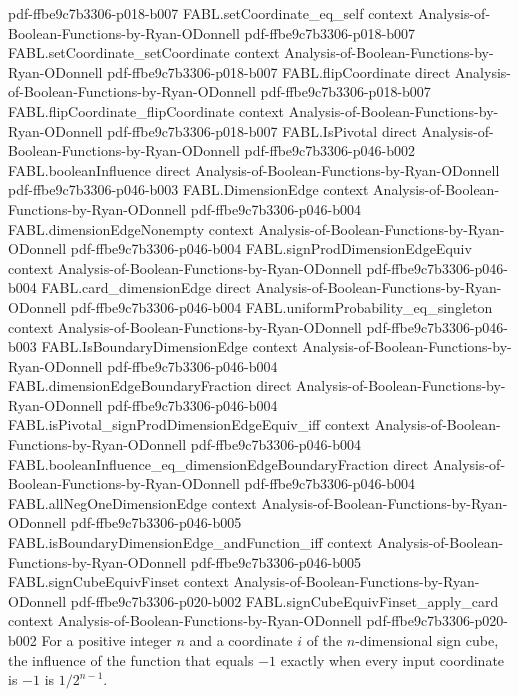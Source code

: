 \begin{theorem}
  {pdf-ffbe9c7b3306-p018-b007}
\proofstep
  {FABL.setCoordinate_eq_self}
  {context}
  {Analysis-of-Boolean-Functions-by-Ryan-ODonnell}
  {pdf-ffbe9c7b3306-p018-b007}
\proofstep
  {FABL.setCoordinate_setCoordinate}
  {context}
  {Analysis-of-Boolean-Functions-by-Ryan-ODonnell}
  {pdf-ffbe9c7b3306-p018-b007}
\proofstep
  {FABL.flipCoordinate}
  {direct}
  {Analysis-of-Boolean-Functions-by-Ryan-ODonnell}
  {pdf-ffbe9c7b3306-p018-b007}
\proofstep
  {FABL.flipCoordinate_flipCoordinate}
  {context}
  {Analysis-of-Boolean-Functions-by-Ryan-ODonnell}
  {pdf-ffbe9c7b3306-p018-b007}
\proofstep
  {FABL.IsPivotal}
  {direct}
  {Analysis-of-Boolean-Functions-by-Ryan-ODonnell}
  {pdf-ffbe9c7b3306-p046-b002}
\proofstep
  {FABL.booleanInfluence}
  {direct}
  {Analysis-of-Boolean-Functions-by-Ryan-ODonnell}
  {pdf-ffbe9c7b3306-p046-b003}
\proofstep
  {FABL.DimensionEdge}
  {context}
  {Analysis-of-Boolean-Functions-by-Ryan-ODonnell}
  {pdf-ffbe9c7b3306-p046-b004}
\proofstep
  {FABL.dimensionEdgeNonempty}
  {context}
  {Analysis-of-Boolean-Functions-by-Ryan-ODonnell}
  {pdf-ffbe9c7b3306-p046-b004}
\proofstep
  {FABL.signProdDimensionEdgeEquiv}
  {context}
  {Analysis-of-Boolean-Functions-by-Ryan-ODonnell}
  {pdf-ffbe9c7b3306-p046-b004}
\proofstep
  {FABL.card_dimensionEdge}
  {direct}
  {Analysis-of-Boolean-Functions-by-Ryan-ODonnell}
  {pdf-ffbe9c7b3306-p046-b004}
\proofstep
  {FABL.uniformProbability_eq_singleton}
  {context}
  {Analysis-of-Boolean-Functions-by-Ryan-ODonnell}
  {pdf-ffbe9c7b3306-p046-b003}
\proofstep
  {FABL.IsBoundaryDimensionEdge}
  {context}
  {Analysis-of-Boolean-Functions-by-Ryan-ODonnell}
  {pdf-ffbe9c7b3306-p046-b004}
\proofstep
  {FABL.dimensionEdgeBoundaryFraction}
  {direct}
  {Analysis-of-Boolean-Functions-by-Ryan-ODonnell}
  {pdf-ffbe9c7b3306-p046-b004}
\proofstep
  {FABL.isPivotal_signProdDimensionEdgeEquiv_iff}
  {context}
  {Analysis-of-Boolean-Functions-by-Ryan-ODonnell}
  {pdf-ffbe9c7b3306-p046-b004}
\proofstep
  {FABL.booleanInfluence_eq_dimensionEdgeBoundaryFraction}
  {direct}
  {Analysis-of-Boolean-Functions-by-Ryan-ODonnell}
  {pdf-ffbe9c7b3306-p046-b004}
\proofstep
  {FABL.allNegOneDimensionEdge}
  {context}
  {Analysis-of-Boolean-Functions-by-Ryan-ODonnell}
  {pdf-ffbe9c7b3306-p046-b005}
\proofstep
  {FABL.isBoundaryDimensionEdge_andFunction_iff}
  {context}
  {Analysis-of-Boolean-Functions-by-Ryan-ODonnell}
  {pdf-ffbe9c7b3306-p046-b005}
\proofstep
  {FABL.signCubeEquivFinset}
  {context}
  {Analysis-of-Boolean-Functions-by-Ryan-ODonnell}
  {pdf-ffbe9c7b3306-p020-b002}
\proofstep
  {FABL.signCubeEquivFinset_apply_card}
  {context}
  {Analysis-of-Boolean-Functions-by-Ryan-ODonnell}
  {pdf-ffbe9c7b3306-p020-b002}
For a positive integer $n$ and a coordinate $i$ of the $n$-dimensional sign cube, the
influence of the function that equals $-1$ exactly when every input coordinate is $-1$
is $1/2^{n-1}$.
\end{theorem}

